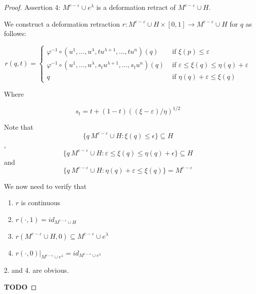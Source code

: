 \begin{proof}
   Assertion 4: $M^{c - \varepsilon} \cup e^{\lambda}$  is a deformation 
   retract of $M^{c - \varepsilon} \cup H$.

   We construct a deformation retraction 
   $r: M^{c - \varepsilon} \cup H \times [0, 1] \rightarrow M^{c - \varepsilon} \cup H$ 
   for $q$ as follows:

   \[ 
      r(q, t) = \begin{cases}
         \varphi^{-1} \circ (u^1, ..., u^{\lambda}, tu^{\lambda + 1}, ..., tu^n) (q) 
               & \text{ if } \xi(p) \leq \varepsilon \\
         \varphi^{-1} \circ (u^1, ..., u^{\lambda}, s_tu^{\lambda + 1}, ..., s_tu^n) (q) 
               & \text { if } \varepsilon \leq \xi(q) \leq \eta(q) + \varepsilon \\
         q & \text{ if } \eta(q) + \varepsilon \leq \xi(q)
      \end{cases}
   \]

   Where 

   \[ s_t = t + (1 - t)((\xi - \varepsilon)/\eta)^{1/2} \]
   
   Note that 
   \[ \{ q \ M^{c - \varepsilon} \cup H : \xi(q) \leq \epsilon \} \subseteq H \],
   \[ \{ q \ M^{c - \varepsilon} \cup H : \varepsilon \leq \xi(q) \leq \eta(q) + \epsilon \} \subseteq H \]
   and
   \[ \{ q \ M^{c - \varepsilon} \cup H : \eta(q) + \varepsilon \leq \xi(q) \} = M^{c - \varepsilon}\]

   We now need to verify that
   \begin{enumerate}
      \item $r$ is continuous
      \item $r(\cdot, 1) = id_{M^{c - \varepsilon} \cup H}$
      \item $r(M^{c - \varepsilon} \cup H, 0) 
         \subseteq M^{c - \varepsilon} \cup e^{\lambda}$
      \item $r(\cdot, 0)|_{M^{c - \varepsilon} \cup e^{\lambda}} 
         = id_{M^{c - \varepsilon} \cup e^{\lambda}}$
   \end{enumerate}

   2. and 4. are obvious. 
   
   \textbf{TODO}
 \end{proof}